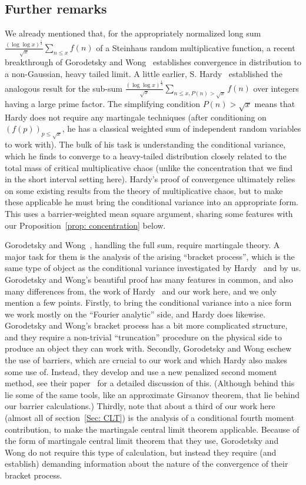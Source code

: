 \documentclass[12pt, notitlepage]{amsart}
\numberwithin{equation}{section}
\theoremstyle{remark}
\theoremstyle{definition}
\theoremstyle{remark}
\numberwithin{equation}{section}
\begin{document}
\subsection{Further remarks}\label{subsec:furtherremarks}
We already mentioned that, for the appropriately normalized long sum $\frac{(\log \log x)^{\frac 14}}{\sqrt{x}} \sum_{n \leq x} f(n)$ of a Steinhaus random multiplicative function, a recent breakthrough of Gorodetsky and Wong~\cite{GW-Final} establishes convergence in distribution to a non-Gaussian, heavy tailed limit. A little earlier, S. Hardy~\cite{hardy} established the analogous result for the sub-sum $\frac{(\log \log x)^{\frac 14}}{\sqrt{x}} \sum_{n \leq x, P(n) > \sqrt{x}} f(n)$ over integers having a large prime factor. The simplifying condition $P(n) > \sqrt{x}$ means that Hardy does not require any martingale techniques (after conditioning on $(f(p))_{p \leq \sqrt{x}}$, he has a classical weighted sum of independent random variables to work with). The bulk of his task is understanding the conditional variance, which he finds to converge to a heavy-tailed distribution closely related to the total mass of critical multiplicative chaos (unlike the concentration that we find in the short interval setting here). Hardy's proof of convergence ultimately relies on some existing results from the theory of multiplicative chaos, but to make these applicable he must bring the conditional variance into an appropriate form. This uses a barrier-weighted mean square argument, sharing some features with our Proposition~\ref{prop: concentration} below.

Gorodetsky and Wong~\cite{GW-Final}, handling the full sum, require martingale theory. A major task for them is the analysis of the arising ``bracket process'', which is the same type of object as the conditional variance investigated by Hardy~\cite{hardy} and by us. Gorodetsky and Wong's beautiful proof has many features in common, and also many differences from, the work of Hardy~\cite{hardy} and our work here, and we only mention a few points. Firstly, to bring the conditional variance into a nice form we work mostly on the ``Fourier analytic'' side, and Hardy does likewise. Gorodetsky and Wong's bracket process has a bit more complicated structure, and they require a non-trivial ``truncation'' procedure on the physical side to produce an object they can work with. Secondly, Gorodetsky and Wong eschew the use of barriers, which are crucial to our work and which Hardy also makes some use of. Instead, they develop and use a new penalized second moment method, see their paper~\cite{GW-Final} for a detailed discussion of this. (Although behind this lie some of the same tools, like an approximate Girsanov theorem, that lie behind our barrier calculations.) Thirdly, note that about a third of our work here (almost all of section~\ref{Sec: CLT}) is the analysis of a conditional fourth moment contribution, to make the martingale central limit theorem applicable. Because of the form of martingale central limit theorem that they use, Gorodetsky and Wong do not require this type of calculation, but instead they require (and establish) demanding information about the nature of the convergence of their bracket process.
\end{document}
